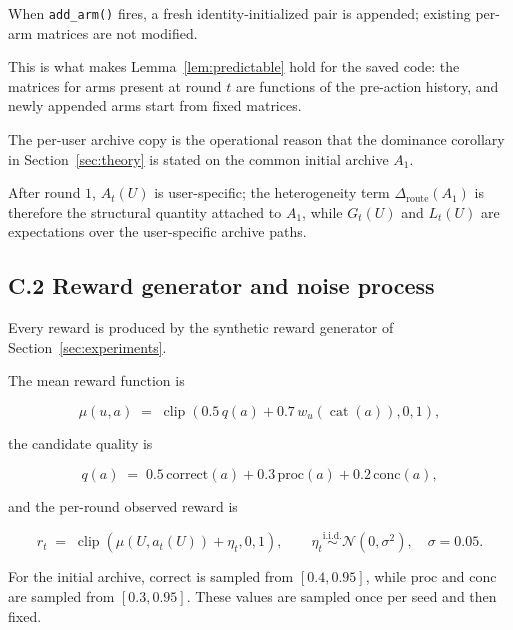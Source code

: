 \documentclass{article} %
\begin{document}
When \texttt{add\_arm()} fires, a fresh identity-initialized pair is appended; existing per-arm matrices are not modified.

This is what makes Lemma~\ref{lem:predictable} hold for the saved code: the
matrices for arms present at round \(t\) are functions of the pre-action
history, and newly appended arms start from fixed matrices.

The per-user archive copy is the operational reason that the dominance corollary in Section~\ref{sec:theory} is stated on the common initial archive $A_1$.

After round $1$, $A_t(U)$ is user-specific; the heterogeneity term $\Delta_{\mathrm{route}}(A_1)$ is therefore the structural quantity attached to $A_1$, while $G_t(U)$ and $L_t(U)$ are expectations over the user-specific archive paths.

\subsection{C.2 Reward generator and noise process}

\label{app:impl-reward}

Every reward is produced by the synthetic reward generator of Section~\ref{sec:experiments}.

The mean reward function is

\begin{equation}
\label{eq:app-impl-mean}
\mu(u,a)
\;=\;
\operatorname{clip}\!\left(
0.5\,q(a)+0.7\,w_u(\operatorname{cat}(a)),0,1
\right),
\end{equation}

the candidate quality is

\begin{equation}
\label{eq:app-impl-q}
q(a) \;=\; 0.5\,\mathrm{correct}(a) + 0.3\,\mathrm{proc}(a) + 0.2\,\mathrm{conc}(a),
\end{equation}

and the per-round observed reward is

\begin{equation}
\label{eq:app-impl-r}
r_t
\;=\;
\operatorname{clip}\!\left(\mu(U,a_t(U))+\eta_t,0,1\right),
\qquad
\eta_t\overset{\mathrm{i.i.d.}}{\sim}\mathcal N(0,\sigma^2),
\quad \sigma=0.05.
\end{equation}

For the initial archive, \(\mathrm{correct}\) is sampled from
\([0.4,0.95]\), while \(\mathrm{proc}\) and \(\mathrm{conc}\) are sampled from
\([0.3,0.95]\). These values are sampled once per seed and then fixed.
\end{document}
